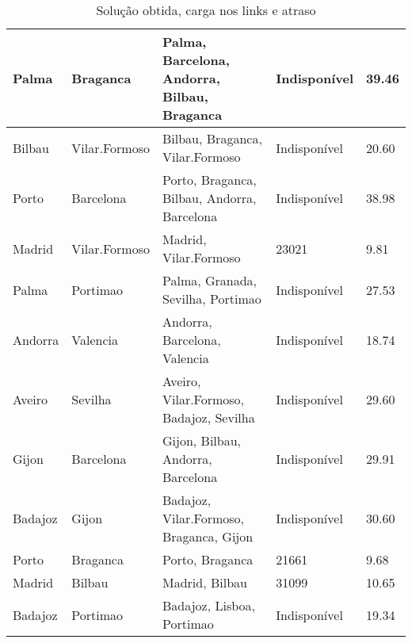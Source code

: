 \begin{table}[!htb]
{\begin{tabular}{|l|l|l|l|l|}
Palma & Braganca & Palma, Barcelona, Andorra, Bilbau, Braganca & Indisponível & 39.46 \\ \hline
Bilbau & Vilar.Formoso & Bilbau, Braganca, Vilar.Formoso & Indisponível & 20.60 \\ \hline
Porto & Barcelona & Porto, Braganca, Bilbau, Andorra, Barcelona & Indisponível & 38.98 \\ \hline
Madrid & Vilar.Formoso & Madrid, Vilar.Formoso & 23021 & 9.81 \\ \hline
Palma & Portimao & Palma, Granada, Sevilha, Portimao & Indisponível & 27.53 \\ \hline
Andorra & Valencia & Andorra, Barcelona, Valencia & Indisponível & 18.74 \\ \hline
Aveiro & Sevilha & Aveiro, Vilar.Formoso, Badajoz, Sevilha & Indisponível & 29.60 \\ \hline
Gijon & Barcelona & Gijon, Bilbau, Andorra, Barcelona & Indisponível & 29.91 \\ \hline
Badajoz & Gijon & Badajoz, Vilar.Formoso, Braganca, Gijon & Indisponível & 30.60 \\ \hline
Porto & Braganca & Porto, Braganca & 21661 & 9.68 \\ \hline
Madrid & Bilbau & Madrid, Bilbau & 31099 & 10.65 \\ \hline
Badajoz & Portimao & Badajoz, Lisboa, Portimao & Indisponível & 19.34 \\ \hline
\end{tabular}}
\caption[]{Solução obtida, carga nos links e atraso}
\end{table}

